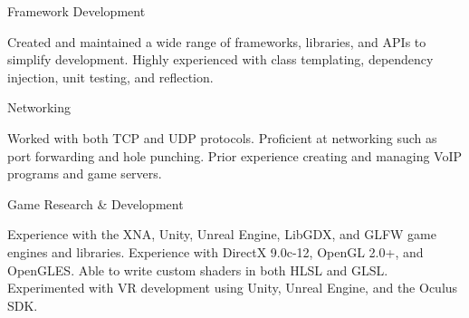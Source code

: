 \vspace{-5mm}

\begin{cventries}
  \cventry%
    {}
    {Framework Development}
    {}
    {}
    {
      \vspace{-5mm}
      \begin{cvitems}
        \item {Created and maintained a wide range of frameworks, libraries, and APIs %
        to simplify development. Highly experienced with class templating, dependency injection, %
        unit testing, and reflection. }
      \end{cvitems}
    }
    \vspace{-1.8mm}
    \cventry%
      {}
      {Networking}
      {}
      {}
      {
        \vspace{-5mm}
        \begin{cvitems}
          \item {Worked with both TCP and UDP protocols. %
          Proficient at networking such as port forwarding and hole punching. %
          Prior experience creating and managing VoIP programs and game servers.}
        \end{cvitems}
      }
      \vspace{-1.8mm}
      \cventry%
        {}
        {Game Research \& Development}
        {}
        {}
        {
          \vspace{-5mm}
          \begin{cvitems}
            \item {Experience with the XNA, Unity, Unreal Engine, LibGDX, and GLFW game engines and %
            libraries. Experience with DirectX 9.0c-12, OpenGL 2.0+, and OpenGLES\@. Able %
            to write custom shaders in both HLSL and GLSL\@. Experimented with VR development %
            using Unity, Unreal Engine, and the Oculus SDK.}
          \end{cvitems}
        }
\end{cventries}
\vspace{-5mm}
